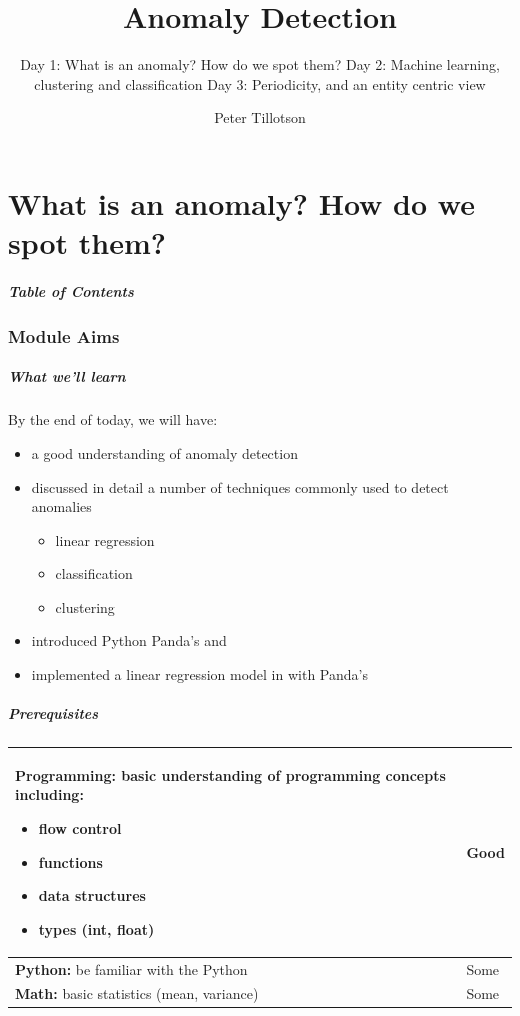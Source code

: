 \documentclass[aspectratio=169]{beamer}
\author{Peter Tillotson}
\institute{Acumed Consulting}
\title{Anomaly Detection}
\subtitle{Day 1: What is an anomaly? How do we spot them?\newline 
Day 2: Machine learning, clustering and classification\newline
Day 3: Periodicity, and an entity centric view 
}
\begin{document}
\frame{\titlepage}


\part{What is an anomaly? How do we spot them?}
\begin{frame}
	\frametitle{Table of Contents}
	\tableofcontents[hideallsubsections]
\end{frame}

\section{Module Aims}
\begin{frame}
\frametitle{What we'll learn}
By the end of today, we will have: 
\begin{itemize}
\item a good understanding of anomaly detection
\item discussed in detail a number of techniques commonly used to detect anomalies
	\begin{itemize}
	\item linear regression
	\item classification 
	\item clustering
	\end{itemize}
\item introduced Python Panda's and
\item implemented a linear regression model in with Panda's
\end{itemize} 
\end{frame}

\begin{frame}
\frametitle{Prerequisites}
\begin{tabular}{|p{8cm} | l|}
\hline
{{\bf Programming:} basic understanding of programming concepts including:
	\begin{itemize}
		\item flow control
		\item functions
		\item data structures
		\item types (int, float)
	\end{itemize}} & Good \\ \hline
{\bf Python:} be familiar with the Python & Some \\ \hline
{\bf Math:} basic statistics (mean, variance) & Some \\
\hline
\end{tabular}
\end{frame}
\end{document}
